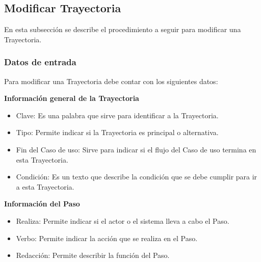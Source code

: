 \subsection{Modificar Trayectoria}
En esta subsección se describe el procedimiento a seguir para modificar una Trayectoria.

\subsubsection{Datos de entrada}
\begin{description}
	\item Para modificar una Trayectoria debe contar con los siguientes datos: \hspace{10pt}
	\begin{description}
	    \item \textbf{Información general de la Trayectoria}
	    \begin{itemize}
		  \item Clave: Es una palabra que sirve para identificar a la Trayectoria.
		  \item Tipo: Permite indicar si la Trayectoria es principal o alternativa.
		  \item Fin del Caso de uso: Sirve para indicar si el flujo del Caso de uso termina en esta Trayectoria.
		  \item Condición: Es un texto que describe la condición que se debe cumplir para ir a esta Trayectoria.
	    \end{itemize}
	    \item \textbf{Información del Paso}
	    \begin{itemize}
		  \item Realiza: Permite indicar si el actor o el sistema lleva a cabo el Paso.
		  \item Verbo: Permite indicar la acción que se realiza en el Paso.
		  \item Redacción: Permite describir la función del Paso.
	    \end{itemize}
	 \end{description}
\end{description}


